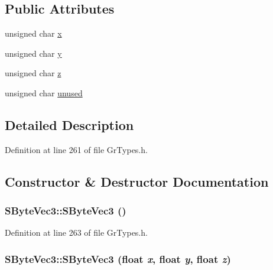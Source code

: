 \subsection*{Public Attributes}
\begin{CompactItemize}
\item 
unsigned char \hyperlink{struct_s_byte_vec3_ff06077b908dd9cabe5013c34ef711b2}{x}
\item 
unsigned char \hyperlink{struct_s_byte_vec3_0bd69fe349fb5b25a6f8db9c16a3290f}{y}
\item 
unsigned char \hyperlink{struct_s_byte_vec3_384e36ccc97f776513293e7132ac1338}{z}
\item 
unsigned char \hyperlink{struct_s_byte_vec3_bd50932cb0fe7b6101e12792e2bce617}{unused}
\end{CompactItemize}


\subsection{Detailed Description}


Definition at line 261 of file GrTypes.h.

\subsection{Constructor \& Destructor Documentation}
\hypertarget{struct_s_byte_vec3_0d8c4c957ad3a2d9be320e0dc137feba}{
\subsubsection[{SByteVec3}]{\setlength{\rightskip}{0pt plus 5cm}SByteVec3::SByteVec3 ()}}
\label{struct_s_byte_vec3_0d8c4c957ad3a2d9be320e0dc137feba}




Definition at line 263 of file GrTypes.h.\hypertarget{struct_s_byte_vec3_a6116e44a4c8a4c480476627e86712d6}{
\subsubsection[{SByteVec3}]{\setlength{\rightskip}{0pt plus 5cm}SByteVec3::SByteVec3 (float {\em x}, \/  float {\em y}, \/  float {\em z})}}
\label{struct_s_byte_vec3_a6116e44a4c8a4c480476627e86712d6}




